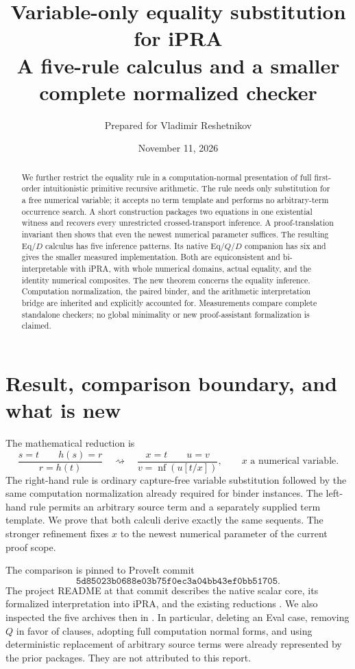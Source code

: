 \documentclass[11pt]{article}
\title{\textbf{Variable-only equality substitution for iPRA}\\
  \large A five-rule calculus and a smaller complete normalized checker}
\author{Prepared for Vladimir Reshetnikov}
\date{November 11, 2026}
\theoremstyle{definition}
\theoremstyle{remark}
\DeclareMathOperator{\nf}{nf}
\newcommand{\code}[1]{\texttt{\detokenize{#1}}}
\begin{document}
\maketitle
\begin{abstract}
We further restrict the equality rule in a computation-normal presentation of
full first-order intuitionistic primitive recursive arithmetic. The rule
needs only substitution for a free numerical variable; it accepts no
term template and performs no arbitrary-term occurrence search. A short
construction packages two equations in one existential witness and recovers
every unrestricted crossed-transport inference. A proof-translation invariant
then shows that even the newest numerical parameter suffices.
The resulting Eq/$D$ calculus has five inference patterns. Its native
Eq/$Q$/$D$ companion has six and gives the smaller measured implementation.
Both are equiconsistent and bi-interpretable with iPRA, with whole numerical
domains, actual equality, and the identity numerical composites.
The new theorem concerns the equality inference. Computation normalization,
the paired binder, and the arithmetic interpretation bridge are inherited
and explicitly accounted for. Measurements compare complete standalone
checkers; no global minimality or new proof-assistant formalization is claimed.
\end{abstract}
\setcounter{tocdepth}{1}
\tableofcontents
\newpage

\section{Result, comparison boundary, and what is new}

The mathematical reduction is
\[
\frac{s=t\qquad h(s)=r}{r=h(t)}
\quad\rightsquigarrow\quad
\frac{x=t\qquad u=v}{v=\nf(u[t/x])},
\qquad x\text{ a numerical variable}.
\]
The right-hand rule is ordinary capture-free variable substitution followed
by the same computation normalization already required for binder instances.
The left-hand rule permits an arbitrary source term and a separately supplied
term template. We prove that both calculi derive exactly the same sequents.
The stronger refinement fixes $x$ to the newest numerical parameter of the
current proof scope.

The comparison is pinned to ProveIt commit
\[
\texttt{5d85023b0688e03b75f0ec3a04bb43ef0bb51705}.
\]
The project README at that commit describes the native scalar core, its
formalized interpretation into iPRA, and the existing reductions
\cite{repo}. We also inspected the five archives then in
\code{ConciseIPRA/docs/incoming}. In particular, deleting an Eval case,
removing $Q$ in favor of clauses, adopting full computation normal forms,
and using deterministic replacement of arbitrary source terms were already
represented by the prior packages. They are not attributed to this report.
\end{document}
